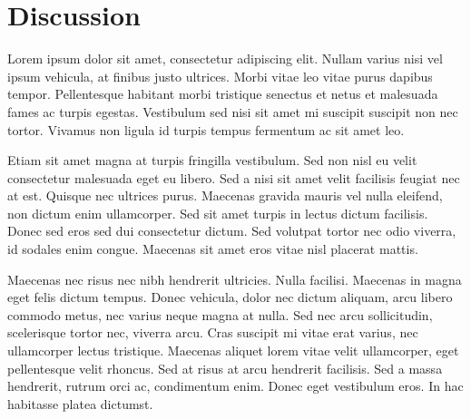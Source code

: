 \section{Discussion}

Lorem ipsum dolor sit amet, consectetur adipiscing elit. Nullam varius nisi vel ipsum vehicula, at finibus justo ultrices. Morbi vitae leo vitae purus dapibus tempor. Pellentesque habitant morbi tristique senectus et netus et malesuada fames ac turpis egestas. Vestibulum sed nisi sit amet mi suscipit suscipit non nec tortor. Vivamus non ligula id turpis tempus fermentum ac sit amet leo.

Etiam sit amet magna at turpis fringilla vestibulum. Sed non nisl eu velit consectetur malesuada eget eu libero. Sed a nisi sit amet velit facilisis feugiat nec at est. Quisque nec ultrices purus. Maecenas gravida mauris vel nulla eleifend, non dictum enim ullamcorper. Sed sit amet turpis in lectus dictum facilisis. Donec sed eros sed dui consectetur dictum. Sed volutpat tortor nec odio viverra, id sodales enim congue. Maecenas sit amet eros vitae nisl placerat mattis.

Maecenas nec risus nec nibh hendrerit ultricies. Nulla facilisi. Maecenas in magna eget felis dictum tempus. Donec vehicula, dolor nec dictum aliquam, arcu libero commodo metus, nec varius neque magna at nulla. Sed nec arcu sollicitudin, scelerisque tortor nec, viverra arcu. Cras suscipit mi vitae erat varius, nec ullamcorper lectus tristique. Maecenas aliquet lorem vitae velit ullamcorper, eget pellentesque velit rhoncus. Sed at risus at arcu hendrerit facilisis. Sed a massa hendrerit, rutrum orci ac, condimentum enim. Donec eget vestibulum eros. In hac habitasse platea dictumst.
